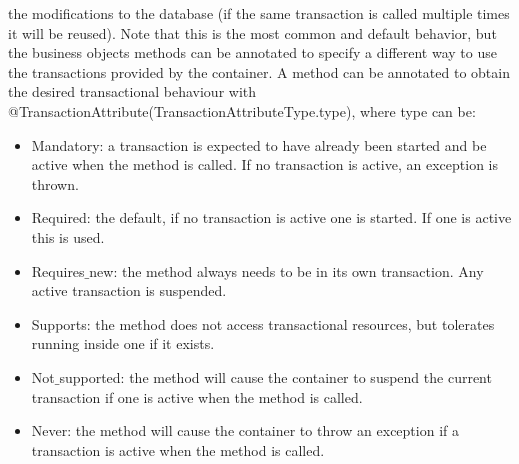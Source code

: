 the modifications to the database (if the same transaction is called multiple times it will be reused). Note that this is the most common and default behavior, but 
the business objects methods can be annotated to specify a different way to use the transactions provided by the container. A method can be annotated to obtain the 
desired transactional behaviour with @TransactionAttribute(TransactionAttributeType.type), where type can be: 
\begin{itemize}
    \item Mandatory: a transaction is expected to have already been started and be active when the method is called. If no transaction is active, an exception is thrown.
    \item Required: the default, if no transaction is active one is started. If one is active this is used.
    \item Requires$\_$new: the method always needs to be in its own transaction. Any active transaction is suspended. 
    \item Supports: the method does not access transactional resources, but tolerates running inside one if it exists.
    \item Not$\_$supported: the method will cause the container to suspend the current transaction if one is active when the method is called. 
    \item Never: the method will cause the container to throw an exception if a transaction is active when the method is called.
\end{itemize}